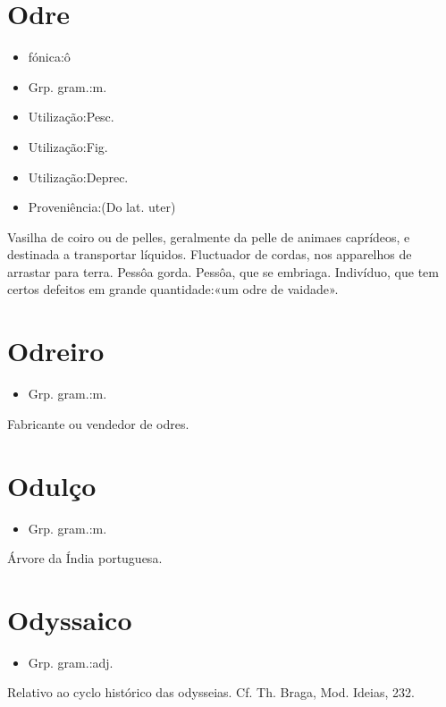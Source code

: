 \section{Odre}
\begin{itemize}
\item {fónica:ô}
\end{itemize}
\begin{itemize}
\item {Grp. gram.:m.}
\end{itemize}
\begin{itemize}
\item {Utilização:Pesc.}
\end{itemize}
\begin{itemize}
\item {Utilização:Fig.}
\end{itemize}
\begin{itemize}
\item {Utilização:Deprec.}
\end{itemize}
\begin{itemize}
\item {Proveniência:(Do lat. \textunderscore uter\textunderscore )}
\end{itemize}
Vasilha de coiro ou de pelles, geralmente da pelle de animaes caprídeos, e destinada a transportar líquidos.
Fluctuador de cordas, nos apparelhos de arrastar para terra.
Pessôa gorda.
Pessôa, que se embriaga.
Indivíduo, que tem certos defeitos em grande quantidade:«\textunderscore um odre de vaidade\textunderscore ».
\section{Odreiro}
\begin{itemize}
\item {Grp. gram.:m.}
\end{itemize}
Fabricante ou vendedor de odres.
\section{Odulço}
\begin{itemize}
\item {Grp. gram.:m.}
\end{itemize}
Árvore da Índia portuguesa.
\section{Odyssaico}
\begin{itemize}
\item {Grp. gram.:adj.}
\end{itemize}
Relativo ao cyclo histórico das odysseias. Cf. Th. Braga, \textunderscore Mod. Ideias\textunderscore , 232.
